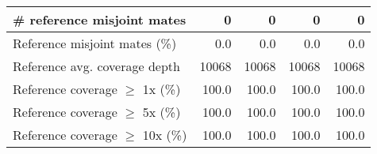 \documentclass[12pt,a4paper]{article}
\begin{document}
\begin{table}[ht]
\begin{center}
\begin{tabular}{|l*{4}{|r}|}
\# reference misjoint mates & 0 & 0 & 0 & 0 \\ \hline
Reference misjoint mates (\%) & 0.0 & 0.0 & 0.0 & 0.0 \\ \hline
Reference avg. coverage depth & 10068 & 10068 & 10068 & 10068 \\ \hline
Reference coverage $\geq$ 1x (\%) & 100.0 & 100.0 & 100.0 & 100.0 \\ \hline
Reference coverage $\geq$ 5x (\%) & 100.0 & 100.0 & 100.0 & 100.0 \\ \hline
Reference coverage $\geq$ 10x (\%) & 100.0 & 100.0 & 100.0 & 100.0 \\ \hline
\end{tabular}
\end{center}
\end{table}
\end{document}
